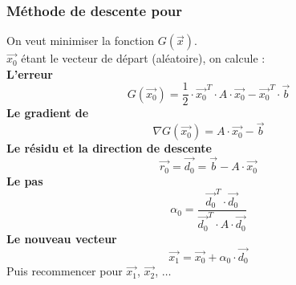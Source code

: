 \subsubsection*{Méthode de descente pour }
\noindent
On veut minimiser la fonction $G(\overrightarrow{x})$.\\
$\overrightarrow{x_0}$ étant le vecteur de départ (aléatoire), on calcule :\\
\textbf{L'erreur}
\begin{equation}
    G(\overrightarrow{x_0})=\frac{1}{2}\cdot \overrightarrow{x_0}^T\cdot A\cdot \overrightarrow{x_0}-\overrightarrow{x_0}^T\cdot \overrightarrow{b}
    \nonumber
\end{equation}
\textbf{Le gradient de }
\begin{equation}
    \nabla G(\overrightarrow{x_0})=A\cdot \overrightarrow{x_0}-\overrightarrow{b}
    \nonumber
\end{equation}
\textbf{Le résidu et la direction de descente}
\begin{equation}
    \overrightarrow{r_0}=\overrightarrow{d_0}=\overrightarrow{b}-A\cdot \overrightarrow{x_0}
    \nonumber
\end{equation}
\textbf{Le pas}
\begin{equation}
    \alpha_0=\frac{\overrightarrow{d_0}^T\cdot \overrightarrow{d_0}}{\overrightarrow{d_0}^T\cdot A\cdot \overrightarrow{d_0}}
    \nonumber
\end{equation}
\textbf{Le nouveau vecteur}
\begin{equation}
    \overrightarrow{x_1}=\overrightarrow{x_0}+\alpha_0\cdot \overrightarrow{d_0}
    \nonumber
\end{equation}
Puis recommencer pour $\overrightarrow{x_1}$, $\overrightarrow{x_2}$, $\dots$\\
